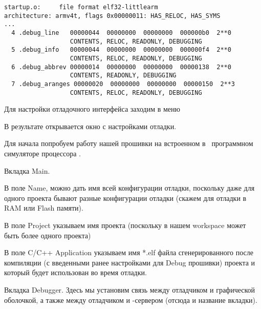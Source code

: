 %
\begin{lstlisting}[style=objdump,title=startup.o.objdump]
startup.o:     file format elf32-littlearm
architecture: armv4t, flags 0x00000011: HAS_RELOC, HAS_SYMS
...
  4 .debug_line   00000044  00000000  00000000  000000b0  2**0
                  CONTENTS, RELOC, READONLY, DEBUGGING
  5 .debug_info   00000044  00000000  00000000  000000f4  2**0
                  CONTENTS, RELOC, READONLY, DEBUGGING
  6 .debug_abbrev 00000014  00000000  00000000  00000138  2**0
                  CONTENTS, READONLY, DEBUGGING
  7 .debug_aranges 00000020  00000000  00000000  00000150  2**3
                  CONTENTS, RELOC, READONLY, DEBUGGING
\end{lstlisting}   

\bigskip
Для настройки отладочного интерфейса заходим в меню



В результате открывается окно с настройками отладки.

\bigskip
Для начала попробуем работу нашей прошивки на встроенном в \gdb\ программном
симуляторе процессора .

\bigskip
Вкладка Main.

\bigskip
В поле Name, можно дать имя всей конфигурации отладки, поскольку даже для одного
проекта бывают разные конфигурации отладки (скажем для отладки в RAM или Flash
памяти).


В поле Project указываем имя проекта (поскольку в нашем workspace может быть
более одного проекта)


В поле C/C++ Application указываем имя *.elf файла сгенерированного после
компиляции (с введенными ранее настройками для Debug прошивки) проекта и который
будет использован во время отладки.





\bigskip
Вкладка Debugger. Здесь мы установим связь между отладчиком и графической
оболочкой, а также между отладчиком и \gdb-сервером (отсюда и название вкладки).

